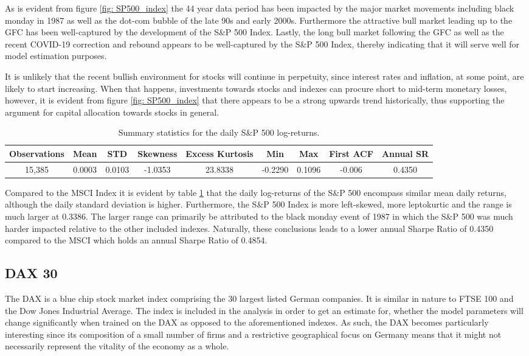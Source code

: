 As is evident from figure \ref{fig: SP500_index} the 44 year data period has been impacted by the major market movements including black monday in 1987 as well as the dot-com bubble of the late 90s and early 2000s. Furthermore the attractive bull market leading up to the GFC has been well-captured by the development of the S\&P 500 Index. Lastly, the long bull market following the GFC as well as the recent COVID-19 correction and rebound appears to be well-captured by the S\&P 500 Index, thereby indicating that it will serve well for model estimation purposes.  

It is unlikely that the recent bullish environment for stocks will continue in perpetuity, since interest rates and inflation, at some point, are likely to start increasing. When that happens, investments towards stocks and indexes can procure short to mid-term monetary losses, however, it is evident from figure \ref{fig: SP500_index} that there appears to be a strong upwards trend historically, thus supporting the argument for capital allocation towards stocks in general.


\begin{table}[H]
\caption{Summary statistics for the daily S\&P 500 log-returns.}
\centering
\begin{tabular}{c c c c c c c c c} 
\hline\hline
Observations & Mean & STD & Skewness & Excess Kurtosis & Min & Max & First ACF & Annual SR \\
\hline
15,385 & 0.0003 & 0.0103 & -1.0353 & 23.8338 & -0.2290 & 0.1096 & -0.006 & 0.4350 \\
\hline
\end{tabular}
\label{tab:summary_stats_S&P500}
\end{table}
 
Compared to the MSCI Index it is evident by table \ref{tab:summary_stats_S&P500} that the daily log-returns of the S\&P 500 encompass similar mean daily returns, although the daily standard deviation is higher. Furthermore, the S\&P 500 Index is more left-skewed, more leptokurtic and the range is much larger at 0.3386. The larger range can primarily be attributed to the black monday event of 1987 in which the S\&P 500 was much harder impacted relative to the other included indexes. Naturally, these conclusions leads to a lower annual Sharpe Ratio of 0.4350 compared to the MSCI which holds an annual Sharpe Ratio of 0.4854.
 
\subsection{DAX 30}
\label{subsection: DAX 30}
The DAX is a blue chip stock market index comprising the 30 largest listed German companies. It is similar in nature to FTSE 100 and the Dow Jones Industrial Average. The index is included in the analysis in order to get an estimate for, whether the model parameters will change significantly when trained on the DAX as opposed to the aforementioned indexes. As such, the DAX becomes particularly interesting since its composition of a small number of firms and a restrictive geographical focus on Germany means that it might not necessarily represent the vitality of the economy as a whole. 

